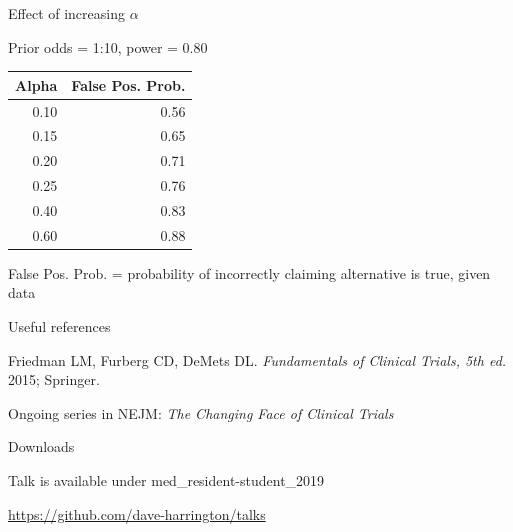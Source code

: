 \documentclass[ignorenonframetext,]{beamer}
\begin{document}
\begin{frame}{Effect of increasing \(\alpha\)}
\protect\hypertarget{effect-of-increasing-alpha}{}

Prior odds = 1:10, power = 0.80

\begin{longtable}[]{@{}rr@{}}
\toprule
Alpha & False Pos. Prob.\tabularnewline
\midrule
\endhead
0.10 & 0.56\tabularnewline
0.15 & 0.65\tabularnewline
0.20 & 0.71\tabularnewline
0.25 & 0.76\tabularnewline
0.40 & 0.83\tabularnewline
0.60 & 0.88\tabularnewline
\bottomrule
\end{longtable}

False Pos. Prob. = probability of incorrectly claiming alternative is
true, given data

\end{frame}

\begin{frame}{Useful references}
\protect\hypertarget{useful-references}{}

Friedman LM, Furberg CD, DeMets DL.
\textit{Fundamentals of Clinical Trials,  5th ed.} 2015; Springer.

Ongoing series in NEJM: \textit{The Changing Face of Clinical Trials}

\end{frame}

\begin{frame}{Downloads}
\protect\hypertarget{downloads}{}

Talk is available under med\_resident-student\_2019

\url{https://github.com/dave-harrington/talks}

\end{frame}
\end{document}
